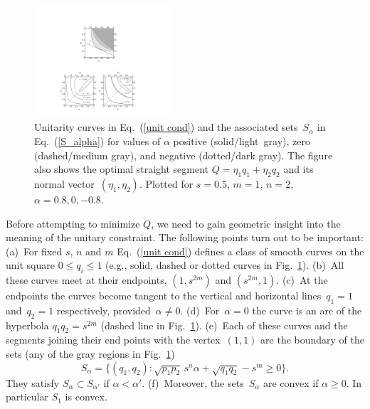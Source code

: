 \documentclass[aps,prl,twocolumn,showpacs]{revtex4}
\begin{document}
\begin{figure}[h]
\centering
\includegraphics[width=14em]{Fig_1NC.pdf}
%
\caption{Unitarity curves in Eq.~(\ref{unit cond}) and the associated sets~$S_\alpha$ in Eq.~(\ref{S_alpha}) for values of $\alpha$ positive (solid/light~gray), zero (dashed/medium gray), and negative (dotted/dark gray). The figure also shows the optimal straight segment \mbox{$Q=\eta_1 q_1+\eta_2 q_2$} and its normal vector~$(\eta_1,\eta_2)$. Plotted for  $s = 0.5$, $m = 1$, $n =2$, $\alpha = 0.8,0,-0.8$.}
\label{fig:1}
\end{figure}

Before attempting to minimize $Q$, we need to gain geometric insight into the meaning of the unitary constraint.
The following points turn out to be important:
(a)~For fixed $s$, $n$ and $m$ Eq.~(\ref{unit cond}) defines a class of smooth curves on the unit square $0\le q_i\le 1$ (e.g., solid, dashed or dotted curves in Fig.~\ref{fig:1}). (b)~All these curves meet at their endpoints, $(1,s^{2m})$ and $(s^{2m},1)$. (c)~At the endpoints  the curves become tangent to the vertical and horizontal lines~$q_1=1$ and~$q_2=1$ respectively, provided~$\alpha\not=0$. %
(d)~For~$\alpha=0$ the curve %
is an arc of the hyperbola $q_1 q_2=s^{2m}$ (dashed line in Fig.~\ref{fig:1}). 
%
(e)~Each of these curves and the segments joining their end points with the vertex~$(1,1)$ are the boundary of the sets (any of the gray regions in Fig.~\ref{fig:1})
%
\begin{equation}
S_\alpha=\{ (q_1,q_2): \sqrt{p_1 p_2}\,s^n\alpha+\sqrt{q_1 q_2}-s^m\ge 0\}.
\label{S_alpha}
\end{equation}
%
They satisfy $S_{\alpha}\subset S_{\alpha'}$ if $\alpha<\alpha'$.
(f)~Moreover, the sets~$S_\alpha$ are convex if $\alpha\ge0$. In particular $S_1$ is convex.
\end{document}
